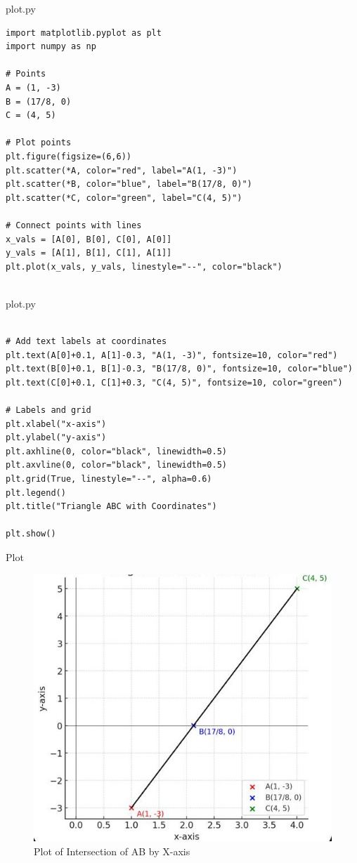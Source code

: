 \documentclass{beamer}
\begin{document}
\begin{frame}[fragile]{plot.py}
\begin{lstlisting}
import matplotlib.pyplot as plt
import numpy as np

# Points
A = (1, -3)
B = (17/8, 0)
C = (4, 5)

# Plot points
plt.figure(figsize=(6,6))
plt.scatter(*A, color="red", label="A(1, -3)")
plt.scatter(*B, color="blue", label="B(17/8, 0)")
plt.scatter(*C, color="green", label="C(4, 5)")

# Connect points with lines
x_vals = [A[0], B[0], C[0], A[0]]
y_vals = [A[1], B[1], C[1], A[1]]
plt.plot(x_vals, y_vals, linestyle="--", color="black")


\end{lstlisting}
\end{frame}

\begin{frame}[fragile]{plot.py}
\begin{lstlisting}

# Add text labels at coordinates
plt.text(A[0]+0.1, A[1]-0.3, "A(1, -3)", fontsize=10, color="red")
plt.text(B[0]+0.1, B[1]-0.3, "B(17/8, 0)", fontsize=10, color="blue")
plt.text(C[0]+0.1, C[1]+0.3, "C(4, 5)", fontsize=10, color="green")

# Labels and grid
plt.xlabel("x-axis")
plt.ylabel("y-axis")
plt.axhline(0, color="black", linewidth=0.5)
plt.axvline(0, color="black", linewidth=0.5)
plt.grid(True, linestyle="--", alpha=0.6)
plt.legend()
plt.title("Triangle ABC with Coordinates")

plt.show()

\end{lstlisting}
\end{frame}

\begin{frame}{Plot}
    \begin{figure}
        \centering
        \includegraphics[width=0.5\columnwidth]{figs/graph.png}
        \caption{Plot of Intersection of AB by X-axis}
        \label{fig:graph.png}
    \end{figure}
\end{frame}
\end{document}
